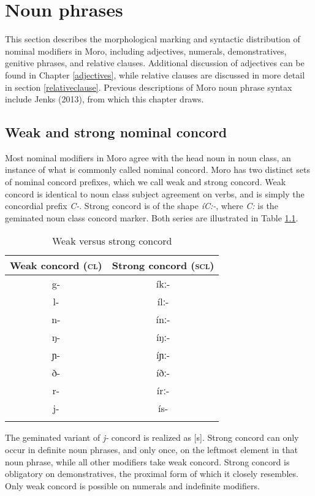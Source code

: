 \chapter{Noun phrases}\label{chapter:nounphrase}

This section describes the morphological marking and syntactic distribution of nominal modifiers in Moro, including adjectives, numerals, demonstratives, genitive phrases, and relative clauses. Additional discussion of adjectives can be found in Chapter \ref{adjectives}, while relative clauses are discussed in more detail in section \ref{relativeclause}. Previous descriptions of Moro noun phrase syntax include Jenks (2013), from which this chapter draws.

\section{Weak and strong nominal concord}\label{concord}

Most nominal modifiers in Moro agree with the head noun in noun class, an instance of what is commonly called nominal concord. Moro has two distinct sets of nominal concord prefixes, which we call weak and strong concord. Weak concord is identical to noun class subject agreement on verbs, and is simply the concordial prefix \textit{C-}. Strong concord is of the shape \textit{íC:-}, where \textit{C:} is the geminated noun class concord marker.  Both series are illustrated in Table \ref{tab:ch8:1}.

\begin{table}
	\begin{tabular}[t]{cc}
\lsptoprule
Weak concord (\textsc{cl}) & Strong concord (\textsc{scl}) \\
\midrule
g-	&	íkː-	\\
l-	&	ílː-	\\
n-	&	ínː-	\\
ŋ-	&	íŋː-	\\
ɲ-	&	íɲː-	\\
ð-	&	íðː-	\\
r-	&	írː-	\\
j- &	ís- 	\\
\lspbottomrule	
\end{tabular}
  \caption{Weak versus strong concord}
  \label{tab:ch8:1}
\end{table}
The geminated variant of \textit{j-} concord is realized as [s]. Strong concord can only occur in definite noun phrases, and only once, on the leftmost element in that noun phrase, while all other modifiers take weak concord. Strong concord is obligatory on demonstratives, the proximal form of which it closely resembles. Only weak concord is possible on numerals and indefinite modifiers. 

